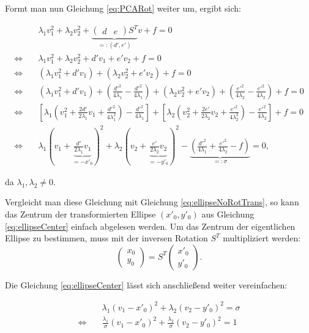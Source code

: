 Formt man nun Gleichung \ref{eq:PCARot} weiter um, ergibt sich:

\begin{equation}\label{eq:ellipseCenter}
\begin{aligned}
&\lambda_1v_1^2 + \lambda_2v_2^2 + \underbrace{\begin{pmatrix}d & e\end{pmatrix}S^T}_{=:(d', e')}v + f = 0 \\
\Leftrightarrow\quad &\lambda_1v_1^2 + \lambda_2v_2^2 + d'v_1 + e'v_2 + f = 0 \\
\Leftrightarrow\quad &(\lambda_1v_1^2 + d'v_1)+ (\lambda_2v_2^2 + e'v_2) + f = 0\\
\Leftrightarrow\quad &(\lambda_1v_1^2 + d'v_1) + (\frac{d'^2}{4\lambda_1} - \frac{d'^2}{4\lambda_1}) + (\lambda_2v_2^2 + e'v_2) + (\frac{e'^2}{4\lambda_2} - \frac{e'^2}{4\lambda_2}) + f = 0 \\
\Leftrightarrow\quad &\left[\lambda_1\left(v_1^2 + \frac{2d'}{2\lambda_1}v_1 + \frac{d'^2}{4\lambda_1^2}\right) - \frac{d'^2}{4\lambda_1}\right] +\left[\lambda_2\left(v_2^2 + \frac{2e'}{2\lambda_2}v_2 + \frac{e'^2}{4\lambda_2^2}\right) - \frac{e'^2}{4\lambda_2}\right] + f = 0 \\
\Leftrightarrow\quad &\lambda_1(v_1 + \underbrace{\frac{d'}{2\lambda_1}v_1}_{ = -x'_0})^2 +\lambda_2(v_2 + \underbrace{\frac{e'}{2\lambda_2}v_2}_{ = -y'_0})^2 - \underbrace{(\frac{d'^2}{4\lambda_1} + \frac{e'^2}{4\lambda_2} - f)}_{=:\sigma} = 0,
\end{aligned}
\end{equation}

da $\lambda_1, \lambda_2 \neq 0$.

Vergleicht man diese Gleichung mit Gleichung \ref{eq:ellipseNoRotTrans}, so kann das Zentrum der transformierten Ellipse $(x'_0, y'_0)$ aus Gleichung \ref{eq:ellipseCenter} einfach abgelesen werden. 
Um das Zentrum der eigentlichen Ellipse zu bestimmen, muss mit der inversen Rotation $S^T$ multipliziert werden:
\[
\begin{pmatrix} x_0 \\ y_0 \end{pmatrix} = S^T \begin{pmatrix} x'_0 \\ y'_0 \end{pmatrix}.
\]

Die Gleichung \ref{eq:ellipseCenter} lässt sich anschließend weiter vereinfachen:

\begin{equation} \label{eq:PCAKoeff}
\begin{aligned}
&\lambda_1(v_1 -x'_0)^2 +\lambda_2(v_2 -y'_0)^2 = \sigma \\
\Leftrightarrow\quad & \frac{\lambda_1}{\sigma}(v_1 -x'_0)^2 +\frac{\lambda_2}{\sigma}(v_2 -y'_0)^2  =1
\end{aligned}
\end{equation}

